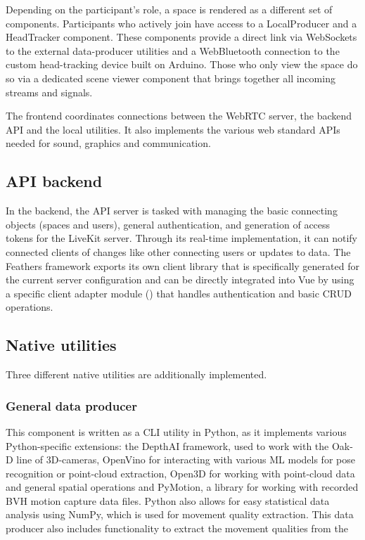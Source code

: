 Depending on the participant's role, a space is rendered as a different set of components. Participants who actively join have access to a LocalProducer and a HeadTracker component. These components provide a direct link via WebSockets to the external data-producer utilities and a WebBluetooth connection to the custom head-tracking device built on Arduino. Those who only view the space do so via a dedicated scene viewer component that brings together all incoming streams and signals.

The frontend coordinates connections between the WebRTC server, the backend \ac{API} and the local utilities. It also implements the various web standard \ac{API}s needed for sound, graphics and communication.

\subsection{API backend}

In the backend, the \ac{API} server is tasked with managing the basic connecting objects (spaces and users), general authentication, and generation of access tokens for the LiveKit server. Through its real-time implementation, it can notify connected clients of changes like other connecting users or updates to data. The Feathers framework exports its own client library that is specifically generated for the current server configuration and can be directly integrated into Vue by using a specific client adapter module () that handles authentication and basic \ac{CRUD} operations.

\subsection{Native utilities}

Three different native utilities are additionally implemented.

\subsubsection{General data producer}

This component is written as a \ac{CLI} utility in Python, as it implements various Python-specific extensions: the DepthAI framework, used to work with the Oak-D line of \ac{3D}-cameras, OpenVino for interacting with various \ac{ML} models for pose recognition or point-cloud extraction, Open3D for working with point-cloud data and general spatial operations and PyMotion, a library for working with recorded \ac{BVH} motion capture data files. Python also allows for easy statistical data analysis using NumPy, which is used for movement quality extraction. This data producer also includes functionality to extract the movement qualities from the 

